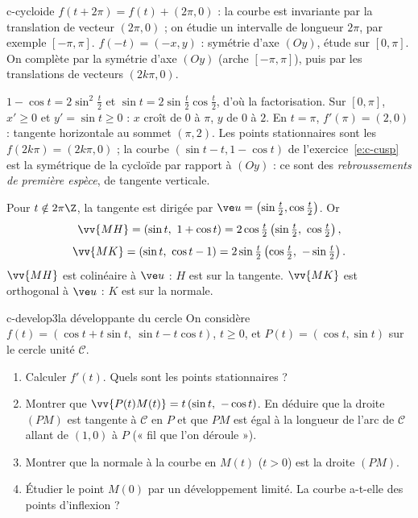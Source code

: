\begin{corrige}{c-cycloide}
 $f(t+2\pi)=f(t)+(2\pi,0)$ : la courbe est invariante par la translation de vecteur $(2\pi,0)$ ; on étudie un intervalle de longueur $2\pi$, par exemple $[-\pi,\pi]$. $f(-t)=(-x,y)$ : symétrie d'axe $(Oy)$, étude sur $[0,\pi]$. On complète par la symétrie d'axe $(Oy)$ (arche $[-\pi,\pi]$), puis par les translations de vecteurs $(2k\pi,0)$.

 $1-\cos t=2\sin^2\frac t2$ et $\sin t=2\sin\frac t2\cos\frac t2$, d'où la factorisation. Sur $[0,\pi]$, $x'\geq0$ et $y'=\sin t\geq0$ : $x$ croît de $0$ à $\pi$, $y$ de $0$ à $2$. En $t=\pi$, $f'(\pi)=(2,0)$ : tangente horizontale au sommet $(\pi,2)$. Les points stationnaires sont les $f(2k\pi)=(2k\pi,0)$ ; la courbe $(\sin t-t,1-\cos t)$ de l'exercice~\ref{e:c-cusp} est la symétrique de la cycloïde par rapport à $(Oy)$ : ce sont des \emph{rebroussements de première espèce}, de tangente verticale.

 Pour $t\notin2\pi\Z$, la tangente est dirigée par $\ve u=\left(\sin\frac t2,\cos\frac t2\right)$. Or
\[\vv{MH}=(\sin t,\ 1+\cos t)=2\cos\tfrac t2\left(\sin\tfrac t2,\ \cos\tfrac t2\right),\]
\[\vv{MK}=(\sin t,\ \cos t-1)=2\sin\tfrac t2\left(\cos\tfrac t2,\ -\sin\tfrac t2\right).\]
$\vv{MH}$ est colinéaire à $\ve u$ : $H$ est sur la tangente. $\vv{MK}$ est orthogonal à $\ve u$ : $K$ est sur la normale.
\end{corrige}

\begin{exo}{c-develop}{3}{la développante du cercle}
On considère $f(t)=(\cos t+t\sin t,\ \sin t-t\cos t)$, $t\geq0$, et $P(t)=(\cos t,\sin t)$ sur le cercle unité $\mathcal C$.
\begin{enumerate}
\item Calculer $f'(t)$. Quels sont les points stationnaires ?
\item Montrer que $\vv{P(t)M(t)}=t\,(\sin t,\ -\cos t)$. En déduire que la droite $(PM)$ est tangente à $\mathcal C$ en $P$ et que $PM$ est égal à la longueur de l'arc de $\mathcal C$ allant de $(1,0)$ à $P$ (« fil que l'on déroule »).
\item Montrer que la normale à la courbe en $M(t)$ ($t>0$) est la droite $(PM)$.
\item Étudier le point $M(0)$ par un développement limité. La courbe a-t-elle des points d'inflexion ?
\end{enumerate}
\end{exo}

